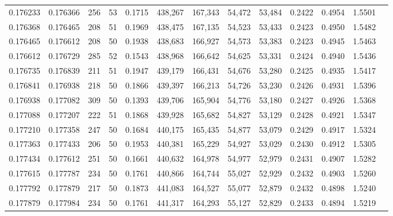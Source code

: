 \begin{tabular}{rrrrrrrrrrrrr}
0.176233 & 0.176366 &   256 &  53 &                                     0.1715 & 438,267 & 167,343 &  54,472 &  53,484 & 0.2422 & 0.4954 & 1.5501 \\
0.176368 & 0.176465 &   208 &  51 &                                     0.1969 & 438,475 & 167,135 &  54,523 &  53,433 & 0.2423 & 0.4950 & 1.5482 \\
0.176465 & 0.176612 &   208 &  50 &                                     0.1938 & 438,683 & 166,927 &  54,573 &  53,383 & 0.2423 & 0.4945 & 1.5463 \\
0.176612 & 0.176729 &   285 &  52 &                                     0.1543 & 438,968 & 166,642 &  54,625 &  53,331 & 0.2424 & 0.4940 & 1.5436 \\
0.176735 & 0.176839 &   211 &  51 &                                     0.1947 & 439,179 & 166,431 &  54,676 &  53,280 & 0.2425 & 0.4935 & 1.5417 \\
0.176841 & 0.176938 &   218 &  50 &                                     0.1866 & 439,397 & 166,213 &  54,726 &  53,230 & 0.2426 & 0.4931 & 1.5396 \\
0.176938 & 0.177082 &   309 &  50 &                                     0.1393 & 439,706 & 165,904 &  54,776 &  53,180 & 0.2427 & 0.4926 & 1.5368 \\
0.177088 & 0.177207 &   222 &  51 &                                     0.1868 & 439,928 & 165,682 &  54,827 &  53,129 & 0.2428 & 0.4921 & 1.5347 \\
0.177210 & 0.177358 &   247 &  50 &                                     0.1684 & 440,175 & 165,435 &  54,877 &  53,079 & 0.2429 & 0.4917 & 1.5324 \\
0.177363 & 0.177433 &   206 &  50 &                                     0.1953 & 440,381 & 165,229 &  54,927 &  53,029 & 0.2430 & 0.4912 & 1.5305 \\
0.177434 & 0.177612 &   251 &  50 &                                     0.1661 & 440,632 & 164,978 &  54,977 &  52,979 & 0.2431 & 0.4907 & 1.5282 \\
0.177615 & 0.177787 &   234 &  50 &                                     0.1761 & 440,866 & 164,744 &  55,027 &  52,929 & 0.2432 & 0.4903 & 1.5260 \\
0.177792 & 0.177879 &   217 &  50 &                                     0.1873 & 441,083 & 164,527 &  55,077 &  52,879 & 0.2432 & 0.4898 & 1.5240 \\
0.177879 & 0.177984 &   234 &  50 &                                     0.1761 & 441,317 & 164,293 &  55,127 &  52,829 & 0.2433 & 0.4894 & 1.5219 \\

\end{tabular}

